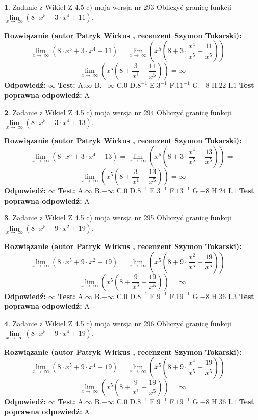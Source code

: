 \documentclass[12pt, a4paper]{article}
\theoremstyle{definition} %
\newtheorem{zad}{}
\newcommand{\zadStart}[1]{\begin{zad}#1\newline}
\newcommand{\zadStop}{\end{zad}}
\newcommand{\rozwStart}[2]{\noindent \textbf{Rozwiązanie (autor #1 , recenzent #2): }\newline}
\newcommand{\rozwStop}{\newline}
\newcommand{\odpStart}{\noindent \textbf{Odpowiedź:}\newline}
\newcommand{\odpStop}{\newline}
\newcommand{\testStart}{\noindent \textbf{Test:}\newline}
\newcommand{\testStop}{\newline}
\newcommand{\kluczStart}{\noindent \textbf{Test poprawna odpowiedź:}\newline}
\newcommand{\kluczStop}{\newline}
\begin{document}
\zadStart{Zadanie z Wikieł Z 4.5 c) moja wersja nr 293}
Obliczyć granicę funkcji  $\lim\limits_{x\to\ \infty}(8 \cdot x^{5}+3 \cdot x^{4}+11)$.
\zadStop
\rozwStart{Patryk Wirkus}{Szymon Tokarski}
$$\lim\limits_{x\to\ \infty}(8 \cdot x^{5}+3 \cdot x^{4}+11) = \lim\limits_{x\to\ \infty}(x^{5}(8 +3 \cdot \frac{x^{4}}{x^{5}}+\frac{11}{x^{5}})) =$$ $$\lim\limits_{x\to\ \infty}(x^{5}(8 +\frac{3}{x^{1}}+\frac{11}{x^{5}})) =\infty$$
\rozwStop
\odpStart
$\infty$
\odpStop
\testStart
A.$\infty$ B.$-\infty$ C.$0$ D.$8^{-1}$ E.$3^{-1}$
F.$11^{-1}$ G.$-8$
H.$22$
I.$1$
\testStop
\kluczStart
A
\kluczStop



\zadStart{Zadanie z Wikieł Z 4.5 c) moja wersja nr 294}
Obliczyć granicę funkcji  $\lim\limits_{x\to\ \infty}(8 \cdot x^{5}+3 \cdot x^{4}+13)$.
\zadStop
\rozwStart{Patryk Wirkus}{Szymon Tokarski}
$$\lim\limits_{x\to\ \infty}(8 \cdot x^{5}+3 \cdot x^{4}+13) = \lim\limits_{x\to\ \infty}(x^{5}(8 +3 \cdot \frac{x^{4}}{x^{5}}+\frac{13}{x^{5}})) =$$ $$\lim\limits_{x\to\ \infty}(x^{5}(8 +\frac{3}{x^{1}}+\frac{13}{x^{5}})) =\infty$$
\rozwStop
\odpStart
$\infty$
\odpStop
\testStart
A.$\infty$ B.$-\infty$ C.$0$ D.$8^{-1}$ E.$3^{-1}$
F.$13^{-1}$ G.$-8$
H.$24$
I.$1$
\testStop
\kluczStart
A
\kluczStop



\zadStart{Zadanie z Wikieł Z 4.5 c) moja wersja nr 295}
Obliczyć granicę funkcji  $\lim\limits_{x\to\ \infty}(8 \cdot x^{5}+9 \cdot x^{2}+19)$.
\zadStop
\rozwStart{Patryk Wirkus}{Szymon Tokarski}
$$\lim\limits_{x\to\ \infty}(8 \cdot x^{5}+9 \cdot x^{2}+19) = \lim\limits_{x\to\ \infty}(x^{5}(8 +9 \cdot \frac{x^{2}}{x^{5}}+\frac{19}{x^{5}})) =$$ $$\lim\limits_{x\to\ \infty}(x^{5}(8 +\frac{9}{x^{3}}+\frac{19}{x^{5}})) =\infty$$
\rozwStop
\odpStart
$\infty$
\odpStop
\testStart
A.$\infty$ B.$-\infty$ C.$0$ D.$8^{-1}$ E.$9^{-1}$
F.$19^{-1}$ G.$-8$
H.$36$
I.$3$
\testStop
\kluczStart
A
\kluczStop



\zadStart{Zadanie z Wikieł Z 4.5 c) moja wersja nr 296}
Obliczyć granicę funkcji  $\lim\limits_{x\to\ \infty}(8 \cdot x^{5}+9 \cdot x^{4}+19)$.
\zadStop
\rozwStart{Patryk Wirkus}{Szymon Tokarski}
$$\lim\limits_{x\to\ \infty}(8 \cdot x^{5}+9 \cdot x^{4}+19) = \lim\limits_{x\to\ \infty}(x^{5}(8 +9 \cdot \frac{x^{4}}{x^{5}}+\frac{19}{x^{5}})) =$$ $$\lim\limits_{x\to\ \infty}(x^{5}(8 +\frac{9}{x^{1}}+\frac{19}{x^{5}})) =\infty$$
\rozwStop
\odpStart
$\infty$
\odpStop
\testStart
A.$\infty$ B.$-\infty$ C.$0$ D.$8^{-1}$ E.$9^{-1}$
F.$19^{-1}$ G.$-8$
H.$36$
I.$1$
\testStop
\kluczStart
A
\kluczStop
\end{document}
